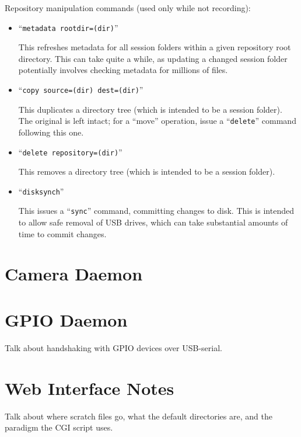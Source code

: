 Repository manipulation commands (used only while not recording):
\begin{itemize}
\item ``\verb+metadata rootdir=(dir)+''

This refreshes metadata for all session folders within a given repository
root directory. This can take quite a while, as updating a changed session 
folder potentially involves checking metadata for millions of files.

\item ``\verb+copy source=(dir) dest=(dir)+''

This duplicates a directory tree (which is intended to be a session folder). 
The original is left intact; for a ``move'' operation, issue a 
``\verb+delete+'' command following this one.

\item ``\verb+delete repository=(dir)+''

This removes a directory tree (which is intended to be a session folder).

\item ``\verb+disksynch+''

This issues a ``\verb+sync+'' command, committing changes to disk. This is
intended to allow safe removal of USB drives, which can take substantial
amounts of time to commit changes.
%
\end{itemize}

\section{Camera Daemon}


\section{GPIO Daemon}


Talk about handshaking with GPIO devices over USB-serial.

\section{Web Interface Notes}


Talk about where scratch files go, what the default directories are,
and the paradigm the CGI script uses.


%
